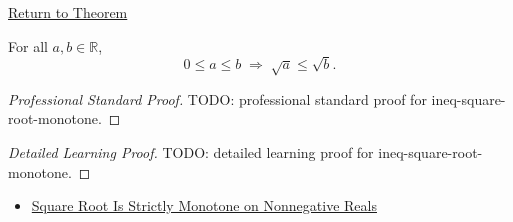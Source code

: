 \newpage
{}
\label{prf:ineq-square-root-monotone}

\begin{remark*}[Return]
\hyperref[thm:ineq-square-root-monotone]{Return to Theorem}
\end{remark*}

\begin{theorem*}
For all $a, b \in \mathbb{R}$,
\[
  0 \le a \le b \;\Rightarrow\; \sqrt{a} \le \sqrt{b}.
\]
\end{theorem*}

\begin{proof}[Professional Standard Proof]
\LRAProofBodyStart
TODO: professional standard proof for ineq-square-root-monotone.
\end{proof}

\begin{proof}[Detailed Learning Proof]
\LRAProofBodyStart
TODO: detailed learning proof for ineq-square-root-monotone.
\end{proof}

\begin{remark*}
\end{remark*}

\begin{dependencies}
\begin{itemize}
  \item \hyperref[thm:ineq-square-root-strict-monotone]{Square Root Is Strictly Monotone on Nonnegative Reals}
\end{itemize}
\end{dependencies}

\clearpage
